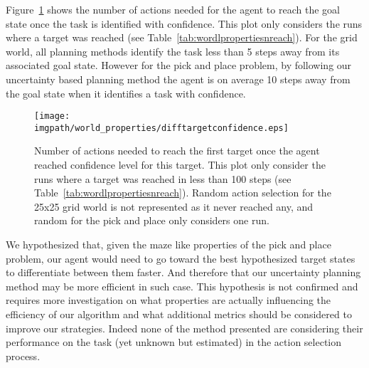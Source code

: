 Figure~\ref{fig:wordlpropertiestargetdist} shows the number of actions needed for the agent to reach the goal state once the task is identified with confidence. This plot only considers the runs where a target was reached (see Table~\ref{tab:wordlpropertiesnreach}). For the grid world, all planning methods identify the task less than 5 steps away from its associated goal state. However for the pick and place problem, by following our uncertainty based planning method the agent is on average 10 steps away from the goal state when it identifies a task with confidence.

\begin{figure}[!htbp]
\centering
\texttt{[image: \\imgpath/world\_properties/difftargetconfidence.eps]}
\caption{Number of actions needed to reach the first target once the agent reached confidence level for this target. This plot only consider the runs where a target was reached in less than 100 steps (see Table~\ref{tab:wordlpropertiesnreach}). Random action selection for the 25x25 grid world is not represented as it never reached any, and random for the pick and place only considers one run.}
\label{fig:wordlpropertiestargetdist}
\end{figure} 

We hypothesized that, given the maze like properties of the pick and place problem, our agent would need to go toward the best hypothesized target states to differentiate between them faster. And therefore that our uncertainty planning method may be more efficient in such case. This hypothesis is not confirmed and requires more investigation on what properties are actually influencing the efficiency of our algorithm and what additional metrics should be considered to improve our strategies. Indeed none of the method presented are considering their performance on the task (yet unknown but estimated) in the action selection process. 



